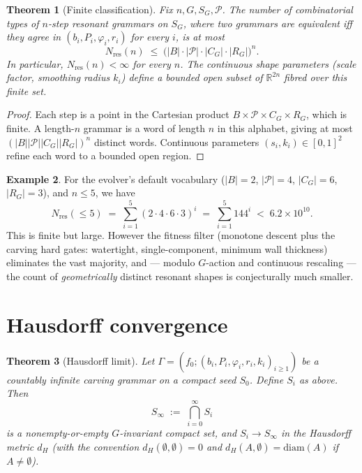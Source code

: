 \documentclass[11pt]{article}
\newtheorem{theorem}{Theorem}
\theoremstyle{definition}
\newtheorem{example}[theorem]{Example}
\begin{document}
\begin{theorem}[Finite classification]
\label{thm:finite}
Fix $n, G, S_G, \mathcal{P}$. The number of combinatorial types of
$n$-step resonant grammars on $S_G$, where two grammars are equivalent
iff they agree in $(b_i, P_i, \varphi_i, r_i)$ for every $i$, is at
most
\[
  N_{\mathrm{res}}(n) \;\le\;
  \bigl(|B| \cdot |\mathcal{P}| \cdot |C_G| \cdot |R_G|\bigr)^{n}.
\]
In particular, $N_{\mathrm{res}}(n) < \infty$ for every $n$. The
continuous shape parameters (scale factor, smoothing radius $k_i$)
define a bounded open subset of $\mathbb{R}^{2n}$ fibred over this
finite set.
\end{theorem}

\begin{proof}
Each step is a point in the Cartesian product
$B \times \mathcal{P} \times C_G \times R_G$, which is finite. A
length-$n$ grammar is a word of length $n$ in this alphabet, giving at
most $(|B||\mathcal{P}||C_G||R_G|)^n$ distinct words. Continuous
parameters $(s_i, k_i) \in [0,1]^2$ refine each word to a bounded open
region.
\end{proof}

\begin{example}
For the evolver's default vocabulary
($|B|=2$, $|\mathcal{P}|=4$, $|C_G|=6$, $|R_G|=3$), and $n \le 5$, we
have
\[
  N_{\mathrm{res}}(\le 5) \;=\;
  \sum_{i=1}^{5}(2\cdot 4 \cdot 6 \cdot 3)^{i} \;=\;
  \sum_{i=1}^{5} 144^{i} \;<\; 6.2 \times 10^{10}.
\]
This is finite but large. However the fitness filter (monotone descent
plus the carving hard gates: watertight, single-component, minimum wall
thickness) eliminates the vast majority, and --- modulo $G$-action and
continuous rescaling --- the count of \emph{geometrically} distinct
resonant shapes is conjecturally much smaller.
\end{example}

\section{Hausdorff convergence}
\label{sec:conv}

\begin{theorem}[Hausdorff limit]
\label{thm:hausdorff}
Let $\Gamma = (f_0; (b_i, P_i, \varphi_i, r_i, k_i)_{i \ge 1})$ be a
countably infinite carving grammar on a compact seed $S_0$. Define
$S_i$ as above. Then
\[
  S_\infty \;:=\; \bigcap_{i=0}^{\infty} S_i
\]
is a nonempty-or-empty $G$-invariant compact set, and
$S_i \to S_\infty$ in the Hausdorff metric $d_H$ (with the convention
$d_H(\emptyset, \emptyset) = 0$ and $d_H(A, \emptyset) = \mathrm{diam}(A)$
if $A \ne \emptyset$).
\end{theorem}
\end{document}
